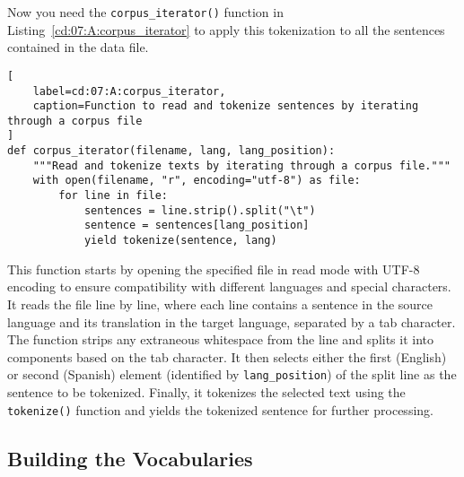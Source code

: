 Now you need the \lstinline{corpus_iterator()} function in Listing~\ref{cd:07:A:corpus_iterator} to apply this tokenization to all the sentences contained in the data file.
\begin{lstlisting}[
    label=cd:07:A:corpus_iterator,
    caption=Function to read and tokenize sentences by iterating through a corpus file
]
def corpus_iterator(filename, lang, lang_position):
    """Read and tokenize texts by iterating through a corpus file."""
    with open(filename, "r", encoding="utf-8") as file:
        for line in file:
            sentences = line.strip().split("\t")
            sentence = sentences[lang_position]
            yield tokenize(sentence, lang)
\end{lstlisting}
This function starts by opening the specified file in read mode with UTF-8 encoding to ensure compatibility with different languages and special characters. 
It reads the file line by line, where each line contains a sentence in the source language and its translation in the target language, separated by a tab character. The function strips any extraneous whitespace from the line and splits it into components based on the tab character. 
It then selects either the first (English) or second (Spanish) element (identified by \lstinline{lang_position}) of the split line as the sentence to be tokenized. Finally, it tokenizes the selected text using the \lstinline{tokenize()} function and yields the tokenized sentence for further processing.

\subsection{Building the Vocabularies}

